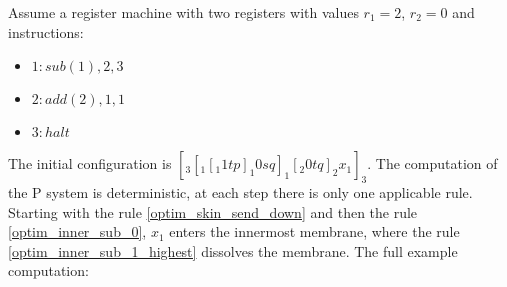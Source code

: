     \begin{example}
      Assume a register machine with two registers with values $r_1 = 2$, $r_2 = 0$ and instructions:
      \begin{itemize}
        \item $1: sub(1),2,3$
        \item $2: add(2),1,1$
        \item $3: halt$
      \end{itemize}

      The initial configuration is $[_3 [_1 [_1 1 t p ]_1 0 s q ]_1 [_2 0 t q ]_2 x_1 ]_3$. The computation of the P system is deterministic, at each step there is only one applicable rule. Starting with the rule \ref{optim_skin_send_down} and then the rule \ref{optim_inner_sub_0}, $x_1$ enters the innermost membrane, where the 
      rule \ref{optim_inner_sub_1_highest} dissolves the membrane. The full example computation:


\end{example}
